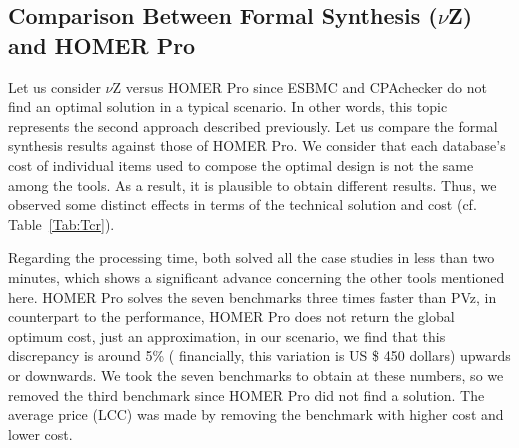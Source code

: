 \documentclass[10pt,journal,compsoc]{IEEEtran}
\begin{document}
\subsection{Comparison Between Formal Synthesis ($\nu$Z) and HOMER Pro}
  
Let us consider $\nu$Z versus HOMER Pro since ESBMC and CPAchecker do not find an optimal solution in a typical scenario. In other words, this topic represents the second approach described previously. Let us compare the formal synthesis results against those of HOMER Pro. We consider that each database's cost of individual items used to compose the optimal design is not the same among the tools. As a result, it is plausible to obtain different results. Thus, we observed some distinct effects in terms of the technical solution and cost (cf. Table~\ref{Tab:Tcr}). 

Regarding the processing time, both solved all the case studies in less than two minutes, which shows a significant advance concerning the other tools mentioned here. HOMER Pro solves the seven benchmarks three times faster than PVz, in counterpart to the performance, HOMER Pro does not return the global optimum cost, just an approximation, in our scenario, we find that this discrepancy is around 5\% ( financially, this variation is US \$ 450 dollars) upwards or downwards. We took the seven benchmarks to obtain at these numbers, so we removed the third benchmark since HOMER Pro did not find a solution. The average price (LCC) was made by removing the benchmark with higher cost and lower cost.
\end{document}
